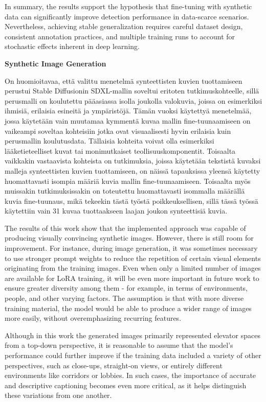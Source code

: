 In summary, the results support the hypothesis that fine-tuning with synthetic data can significantly improve detection performance in data-scarce scenarios. Nevertheless, achieving stable generalization requires careful dataset design, consistent annotation practices, and multiple training runs to account for stochastic effects inherent in deep learning.

\textbf{Synthetic Image Generation}

On huomioitavaa, että valittu menetelmä synteettisten kuvien tuottamiseen perustui Stable Diffusionin SDXL-mallin soveltui eritoten tutkimuskohteelle, sillä perusmalli on koulutettu pääasiassa isolla joukolla valokuvia, joissa on esimerkiksi ihmisiä, erilaisia esineitä ja ympäristöjä. Tämän vuoksi käytettyä menetelmää, jossa käytetään vain muutamaa kymmentä kuvaa mallin fine-tuunaamiseen on vaikeampi soveltaa kohteisiin jotka ovat visuaalisesti hyvin erilaisia kuin perusmallin koulutusdata. Tällaisia kohteita voivat olla esimerkiksi lääketieteelliset kuvat tai monimutkaiset teollisuuskomponentit. Toisaalta vaikkakin vastaavista kohteista on tutkimuksia, joissa käytetään tekstistä kuvaksi malleja synteettisten kuvien tuottamiseen, on näissä tapauksissa yleensä käytetty huomattavasti isompia määriä kuvia mallin fine-tuunaamiseen. Toisaalta myös muissakin tutkimuksissakin on toteutettu huomattavasti isommalla määrällä kuvia fine-tuunaus, mikä tekeekin tästä työstä poikkeuksellisen, sillä tässä työssä käytettiin vain 31 kuvaa tuottaakseen laajan joukon synteettisiä kuvia.

The results of this work show that the implemented approach was capable of producing visually convincing synthetic images. However, there is still room for improvement. For instance, during image generation, it was sometimes necessary to use stronger prompt weights to reduce the repetition of certain visual elements originating from the training images. Even when only a limited number of images are available for LoRA training, it will be even more important in future work to ensure greater diversity among them - for example, in terms of environments, people, and other varying factors. The assumption is that with more diverse training material, the model would be able to produce a wider range of images more easily, without overemphasizing recurring features.

Although in this work the generated images primarily represented elevator spaces from a top-down perspective, it is reasonable to assume that the model’s performance could further improve if the training data included a variety of other perspectives, such as close-ups, straight-on views, or entirely different environments like corridors or lobbies. In such cases, the importance of accurate and descriptive captioning becomes even more critical, as it helps distinguish these variations from one another.



